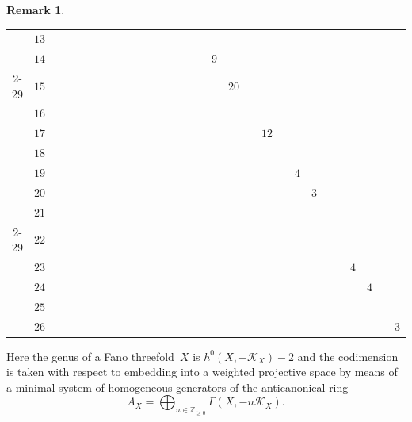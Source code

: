 \documentclass[pdftex]{sigma}%
\theoremstyle{definition}
\newtheorem{rema}[thm]{Remark}
\def\ZZ{{\mathbb Z}}
\numberwithin{equation}{section}
\begin{document}
\begin{rema}
\begin{table}[h!]
\begin{longtable}{c|c|ccccc|ccccc|ccccc|ccccc|ccccc|cc}
	\\
	&${ 13}$ & & & & & & & & & & & & & & & & & & & & & & & & & & &
	\\
	&${ 14}$ & & & & & & & & & & & & & & & \hyperref[T(14,16)]{${ 9}$} & & & & & & & & & & & &
	\\
	\cline{2-29}
	&${ 15}$ & & & & & & & & & & & & & & & & \hyperref[T(15,17)]{${ 20}$} & & & & & & & & & & &
	\\
	&${ 16}$ & & & & & & & & & & & & & & & & & & & & & & & & & & &
	\\
	&${ 17}$ & & & & & & & & & & & & & & & & & & \hyperref[T(17,19)]{${ 12}$} & & & & & & & & &
	\\
	&${ 18}$ & & & & & & & & & & & & & & & & & & & & & & & & & & &
	\\
	&${ 19}$ & & & & & & & & & & & & & & & & & & & & \hyperref[T(19,21)]{${ 4}$} & & & & & & &
	\\
	&${ 20}$ & & & & & & & & & & & & & & & & & & & & & \hyperref[T(20,22)]{${ 3}$} & & & & & &
	\\
	&${ 21}$ & & & & & & & & & & & & & & & & & & & & & & & & & & &
	\\
	\cline{2-29}
	&${ 22}$ & & & & & & & & & & & & & & & & & & & & & & & & & & &
	\\
	&${ 23}$ & & & & & & & & & & & & & & & & & & & & & & & & \hyperref[T(23,25)]{${ 4}$} & & &
	\\
	&${ 24}$ & & & & & & & & & & & & & & & & & & & & & & & & & \hyperref[T(24,26)]{${ 4}$} & &
	\\
	&${ 25}$ & & & & & & & & & & & & & & & & & & & & & & & & & & &
	\\
	&${ 26}$ & & & & & & & & & & & & & & & & & & & & & & & & & & &\hyperref[T(26,28)]{${ 3}$}
	\\
	\hline
 \end{longtable}
\end{table}

\noindent
Here the genus of a Fano threefold~$X$ is $h^0(X,-\mathcal{K}_X)-2$
and the codimension is taken with respect to embedding into
a weighted projective space by means of a minimal system of
homogeneous generators of the anticanonical ring
\[
A_X = \bigoplus_{n \in \ZZ_{\ge 0}} \Gamma(X,-n\mathcal{K}_X).
\]
\end{rema}
\end{document}

